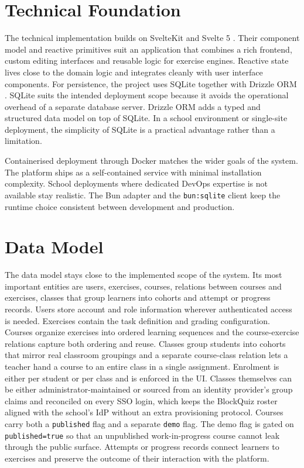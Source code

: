 \section{Technical Foundation}
The technical implementation builds on SvelteKit and Svelte 5 \cite{sveltekit}. Their component 
model and reactive primitives suit an application that combines a rich frontend, custom editing interfaces 
and reusable logic for exercise engines. 
Reactive state lives close to the domain logic and integrates cleanly with user interface components. 
For persistence, the project uses SQLite together with Drizzle ORM \cite{drizzle}. SQLite suits the 
intended deployment scope because it avoids the operational overhead of a separate database server. 
Drizzle ORM adds a typed and structured data model on top of SQLite. In a school environment or single-site 
deployment, the simplicity of SQLite is a practical advantage rather than a limitation. 

Containerised deployment through Docker matches the wider goals of the system. The platform ships as a 
self-contained service with minimal installation complexity. 
School deployments where dedicated DevOps expertise is not available stay realistic. 
The Bun adapter and the \texttt{bun:sqlite} client keep the runtime choice consistent between development and 
production. 

\section{Data Model}
The data model stays close to the implemented scope of the system. Its most important entities are 
users, exercises, courses, relations between courses and exercises, classes that group learners into 
cohorts and attempt or progress records.
Users store account and role information wherever authenticated access is needed.
Exercises contain the task definition and grading configuration.
Courses organize exercises into ordered learning sequences and the course-exercise relations 
capture both ordering and reuse.
Classes group students into cohorts that mirror real classroom groupings and a separate course-class 
relation lets a teacher hand a course to an entire class in a single
assignment. Enrolment is either per student or per class and is enforced in the UI.
Classes themselves can be either administrator-maintained or sourced from an identity provider's group 
claims and reconciled on every SSO login, which keeps
the BlockQuiz roster aligned with the school's IdP without an extra provisioning protocol.
Courses carry both a \texttt{published} flag and a separate \texttt{demo} flag. The demo flag is 
gated on \lstinline{published=true} so that an unpublished work-in-progress course
cannot leak through the public surface. Attempts or progress records connect learners to exercises 
and preserve the outcome of their interaction with the platform.

